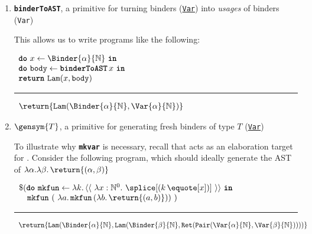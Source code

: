 \begin{enumerate}
\item \textbf{\texttt{binderToAST}}, a primitive for turning binders (\underline{\texttt{Var}}) into \textit{usages} of binders (\texttt{Var})

This allows us to write programs like the following:
\begin{core}
$\begin{array}{l}
  \textbf{\texttt{do}} \, \, {x} \leftarrow {\Binder{\alpha}{\mathbb{N}}} \, \, \textbf{\texttt{in}} \\
  \textbf{\texttt{do}} \, \, {\texttt{body}} \leftarrow \textbf{\texttt{binderToAST}} \, x \, \, \textbf{\texttt{in}} \\
  \textbf{\texttt{return}} \, \, \texttt{Lam}(x, \texttt{body})
\end{array}$
\vspace{2mm} 
\textcolor{coreComment}{\hrule height 0.2mm \relax}
\vspace{2mm} 

\textcolor{coreComment}{$\begin{array}{l}\return{\texttt{Lam}(\Binder{\alpha}{\mathbb{N}}, \Var{\alpha}{\mathbb{N}})}\end{array}$}
\end{core}

\item $\gensym{T}$, a primitive for generating fresh binders of type $T$ (\underline{\texttt{Var}})

To illustrate why \textbf{\texttt{mkvar}} is necessary, recall that \coreLang{} acts as an elaboration target for \sourceLang{}. Consider the following \sourceLang{} program, which should ideally generate the AST of $\lambda \alpha. \lambda \beta. \, \return{(\alpha, \beta)}$

\begin{source}
$\begin{array}{l}
\$(\textbf{\texttt{do}} \, \, \texttt{mkfun} \leftarrow {\lambda k. \, {\langle\langle\,\, \lambda x: \mathbb{N}^0. \,\, \splice[(k \, {\equote[x]})]\,\, \rangle\rangle}} \, \, \textbf{\texttt{in}} \\
\quad \texttt{mkfun} \,\, (\,\, \lambda a. \, \texttt{mkfun} \, (\lambda b. \, \return{(a, b)})) \,\, )
\end{array}$

\vspace{2mm} 
\textcolor{sourceComment}{\hrule height 0.2mm \relax}
\vspace{2mm} 

\textcolor{sourceComment}{$\begin{array}{l}\return{\texttt{Lam}(\Binder{\alpha}{\mathbb{N}}, \texttt{Lam}(\Binder{\beta}{\mathbb{N}}, \texttt{Ret}(\texttt{Pair}(\Var{\alpha}{\mathbb{N}}, \Var{\beta}{\mathbb{N}}))))}\end{array}$}
\end{source}


\end{enumerate}
